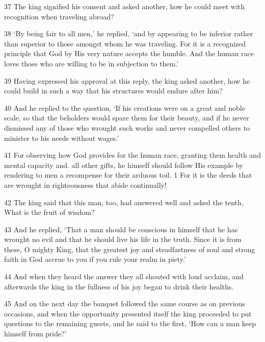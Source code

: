 \par 37 The king signified his consent and asked another, how he could meet with recognition when traveling abroad?

\par 38 ‘By being fair to all men,’ he replied, ‘and by appearing to be inferior rather than superior to those amongst whom he was traveling. For it is a recognized principle that God by His very nature accepts the humble. And the human race loves those who are willing to be in subjection to them.’

\par 39 Having expressed his approval at this reply, the king asked another, how he could build in such a way that his structures would endure after him?

\par 40 And he replied to the question, ‘If his creations were on a great and noble scale, so that the beholders would spare them for their beauty, and if he never dismissed any of those who wrought such works and never compelled others to minister to his needs without wages.’

\par 41 For observing how God provides for the human race, granting them health and mental capacity and. all other gifts, he himself should follow His example by rendering to men a recompense for their arduous toil. 1 For it is the deeds that are wrought in righteousness that abide continually!

\par 42 The king said that this man, too, had answered well and asked the tenth, What is the fruit of wisdom?

\par 43 And he replied, ‘That a man should be conscious in himself that he has wrought no evil and that he should live his life in the truth. Since it is from these, O mighty King, that the greatest joy and steadfastness of soul and strong faith in God accrue to you if you rule your realm in piety.’

\par 44 And when they heard the answer they all shouted with loud acclaim, and afterwards the king in the fullness of his joy began to drink their healths.

\par 45 And on the next day the banquet followed the same course as on previous occasions, and when the opportunity presented itself the king proceeded to put questions to the remaining guests, and he said to the first, ‘How can a man keep himself from pride?’

